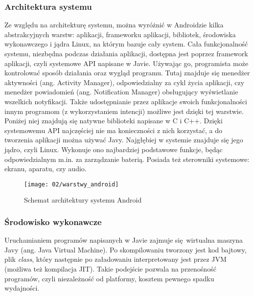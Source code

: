 \subsubsection*{Architektura systemu}
Ze względu na architekturę systemu, można wyróżnić w Androidzie kilka abstrakcyjnych warstw: aplikacji, frameworku aplikacji, bibliotek, środowiska wykonawczego i jądra Linux, na którym bazuje cały system. Cała funkcjonalność systemu, niezbędna podczas działania aplikacji, dostępna jest poprzez framework aplikacji, czyli systemowe API napisane w Javie. Używając go, programista może kontrolować sposób działania oraz wygląd programu. Tutaj znajduje się menedżer aktywności (ang. Activity Manager), odpowiedzialny za cykl życia aplikacji, czy menedżer powiadomień (ang. Notification Manager) obsługujący wyświetlanie wszelkich notyfikacji. Także udostępnianie przez aplikacje swoich funkcjonalności innym programom (z wykorzystaniem intencji) możliwe jest dzięki tej warstwie. Poniżej niej znajdują się natywne biblioteki napisane w C i C++. Dzięki systemowemu API najczęściej nie ma konieczności z nich korzystać, a do tworzenia aplikacji można używać Javy. Najgłębiej w systemie znajduje się jego jądro, czyli Linux. Wykonuje ono najbardziej podstawowe funkcje, będąc odpowiedzialnym m.in. za zarządzanie baterią. Posiada też sterowniki systemowe: ekranu, aparatu, czy audio.

\begin{figure}[h]
	\begin{center}
		\texttt{[image: 02/warstwy\_android]}
	\end{center}
	\caption{Schemat architektury systemu Android}
\end{figure}

\subsubsection*{Środowisko wykonawcze}
Uruchamianiem programów napisanych w Javie zajmuje się wirtualna maszyna Javy (ang. Java Virtual Machine). Po skompilowaniu tworzony jest kod bajtowy, plik \textit{class}, który następnie po załadowaniu interpretowany jest przez JVM (możliwa też kompilacja JIT). Takie podejście pozwala na przenośność programów, czyli niezależność od platformy, kosztem pewnego spadku wydajności.

